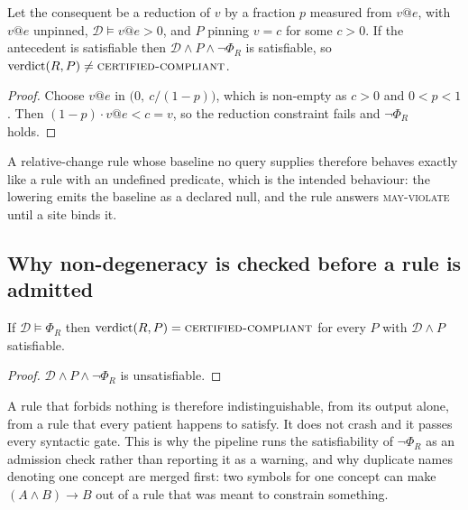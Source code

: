 \begin{proposition}
\label{prop:baseline}
Let the consequent be a reduction of $v$ by a fraction $p$ measured from
$v@e$, with $v@e$ unpinned, $\mathcal{D} \models v@e > 0$, and $P$ pinning $v = c$ for some
$c>0$. If the antecedent is satisfiable then
$\mathcal{D}\wedge P\wedge\neg\Phi_R$ is satisfiable, so
$\mathrm{verdict}(R,P) \neq \textsc{certified-compliant}$.
\end{proposition}
\begin{proof}
Choose $v@e$ in $\bigl(0,\ c/(1-p)\bigr)$, which is non-empty as $c>0$ and
$0<p<1$. Then $(1-p)\cdot v@e < c = v$, so the reduction constraint fails and
$\neg\Phi_R$ holds.
\end{proof}

A relative-change rule whose baseline no query supplies therefore behaves
exactly like a rule with an undefined predicate, which is the intended
behaviour: the lowering emits the baseline as a declared null, and the rule
answers \textsc{may-violate} until a site binds it.

\subsection{Why non-degeneracy is checked before a rule is admitted}

\begin{proposition}
\label{prop:vacuous}
If $\mathcal{D} \models \Phi_R$ then $\mathrm{verdict}(R,P) =
\textsc{certified-compliant}$ for every $P$ with $\mathcal{D}\wedge P$
satisfiable.
\end{proposition}
\begin{proof}
$\mathcal{D}\wedge P\wedge\neg\Phi_R$ is unsatisfiable.
\end{proof}

A rule that forbids nothing is therefore indistinguishable, from its output
alone, from a rule that every patient happens to satisfy. It does not crash and
it passes every syntactic gate. This is why the pipeline runs the satisfiability
of $\neg\Phi_R$ as an admission check rather than reporting it as a warning, and
why duplicate names denoting one concept are merged first: two symbols for one
concept can make $(A \wedge B) \rightarrow B$ out of a rule that was meant to
constrain something.
